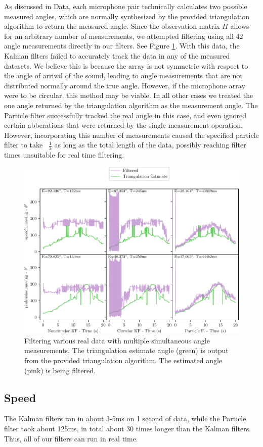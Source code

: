 \documentclass[11pt]{amsart}
\begin{document}
As discussed in Data, each microphone pair technically calculates two possible measured angles, which are normally synthesized by the provided triangulation algorithm to return the measured angle. Since the observation matrix $H$ allows for an arbitrary number of measurements, we attempted filtering using all 42 angle measurements directly in our filters.  
See Figure \ref{fig:multiple_angles}. 
With this data, the Kalman filters failed to accurately track the data in any of the measured datasets. We believe this is because the array is not symmetric with respect to the angle of arrival of the sound, leading to angle measurements that are not distributed normally around the true angle. However, if the microphone array were to be circular, this method may be viable. In all other cases we treated the one angle returned by the triangulation algorithm as the measurement angle. The Particle filter successfully tracked the real angle in this case, and even ignored certain abberations that were returned by the single measurement operation. However, incorporating this number of measurements caused the specified particle filter to take ~$\frac{1}{3}$ as long as the total length of the data, possibly reaching filter times unsuitable for real time filtering.

\begin{figure}[htp]
    \centering
    \includegraphics[width=.75\textwidth]{actual_paper_graphs/multiple_angles.pdf}\hfill
    \caption{Filtering various real data with multiple simultaneous angle measurements. The triangulation estimate angle (green) is output from the provided triangulation algorithm. The estimated angle (pink) is being filtered.}
    \label{fig:multiple_angles}
\end{figure}

\subsection{Speed}
The Kalman filters ran in about 3-5ms on 1 second of data, while the Particle filter took about 125ms, in total about $30$ times longer than the Kalman filters.
Thus, all of our filters can run in real time. 
\end{document}
